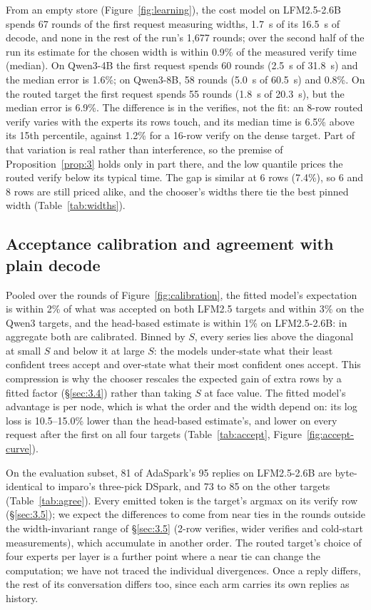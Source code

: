 \documentclass[10pt,twocolumn,letterpaper]{article}
\begin{document}
From an empty store (Figure~\ref{fig:learning}), the cost model on LFM2.5-2.6B spends 67 rounds of the first request measuring widths, 1.7~s of its 16.5~s of decode, and none in the rest of the run's 1,677 rounds; over the second half of the run its estimate for the chosen width is within 0.9\% of the measured verify time (median). On Qwen3-4B the first request spends 60 rounds (2.5~s of 31.8~s) and the median error is 1.6\%; on Qwen3-8B, 58 rounds (5.0~s of 60.5~s) and 0.8\%. On the routed target the first request spends 55 rounds (1.8~s of 20.3~s), but the median error is 6.9\%. The difference is in the verifies, not the fit: an 8-row routed verify varies with the experts its rows touch, and its median time is 6.5\% above its 15th percentile, against 1.2\% for a 16-row verify on the dense target. Part of that variation is real rather than interference, so the premise of Proposition~\ref{prop:3} holds only in part there, and the low quantile prices the routed verify below its typical time. The gap is similar at 6 rows (7.4\%), so 6 and 8 rows are still priced alike, and the chooser's widths there tie the best pinned width (Table~\ref{tab:widths}).

\subsection{Acceptance calibration and agreement with plain decode}\label{sec:4.7}



Pooled over the rounds of Figure~\ref{fig:calibration}, the fitted model's expectation is within 2\% of what was accepted on both LFM2.5 targets and within 3\% on the Qwen3 targets, and the head-based estimate is within 1\% on LFM2.5-2.6B: in aggregate both are calibrated. Binned by $S$, every series lies above the diagonal at small $S$ and below it at large $S$: the models under-state what their least confident trees accept and over-state what their most confident ones accept. This compression is why the chooser rescales the expected gain of extra rows by a fitted factor (\S\ref{sec:3.4}) rather than taking $S$ at face value. The fitted model's advantage is per node, which is what the order and the width depend on: its log loss is 10.5--15.0\% lower than the head-based estimate's, and lower on every request after the first on all four targets (Table~\ref{tab:accept}, Figure~\ref{fig:accept-curve}).



On the evaluation subset, 81 of AdaSpark's 95 replies on LFM2.5-2.6B are byte-identical to imparo's three-pick DSpark, and 73 to 85 on the other targets (Table~\ref{tab:agree}). Every emitted token is the target's argmax on its verify row (\S\ref{sec:3.5}); we expect the differences to come from near ties in the rounds outside the width-invariant range of \S\ref{sec:3.5} (2-row verifies, wider verifies and cold-start measurements), which accumulate in another order. The routed target's choice of four experts per layer is a further point where a near tie can change the computation; we have not traced the individual divergences. Once a reply differs, the rest of its conversation differs too, since each arm carries its own replies as history.
\end{document}
